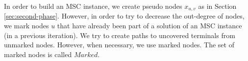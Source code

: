 In order to build an MSC instance, we create pseudo nodes $x_{u, v}$ as in Section \ref{sec:second-phase}. However, in order to
try to decrease the out-degree of nodes, we mark nodes $u$ that have already been part of a solution of an MSC instance (in a
previous iteration).
We try to create paths to uncovered terminals from unmarked nodes. However, when necessary, we use marked nodes. The set of
marked nodes is called $Marked$.




